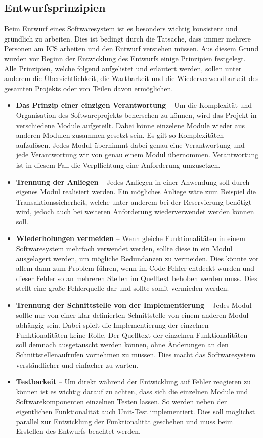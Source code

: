 		\subsection{Entwurfsprinzipien}
		Beim Entwurf eines Softwaresystem ist es besonders wichtig konsistent und gründlich zu arbeiten. Dies ist bedingt durch die Tatsache, dass immer mehrere Personen am \ac{ICS} arbeiten und den Entwurf verstehen müssen. Aus diesem Grund wurden vor Beginn der Entwicklung des Entwurfs einige Prinzipien festgelegt. Alle Prinzipien, welche folgend aufgelistet und erläutert werden, sollen unter anderem die Übersichtlichkeit, die Wartbarkeit und die Wiederverwendbarkeit des gesamten Projekts oder von Teilen davon ermöglichen.
		\begin{itemize}
			\item \textbf{Das Prinzip einer einzigen Verantwortung} -- Um die Komplexität und Organisation des Softwareprojekts beherschen zu können, wird das Projekt in verschiedene Module aufgeteilt. Dabei könne einzelene Module wieder aus anderen Modulen zusammen gesetzt sein. Es gilt so Komplexitäten aufzulösen. Jedes Modul übernimmt dabei genau eine Verantwortung und jede Verantwortung wir von genau einem Modul übernommen. Verantwortung ist in diesem Fall die Verpflichtung eine Anforderung umzusetzen. \autocite[Vgl.][]{Lahres.2015}
			\item \textbf{Trennung der Anliegen} -- Jedes Anliegen in einer Anwendung soll durch eigenes Modul realisiert werden. Ein mögliches Anliege wäre zum Beispiel die Transaktionssicherheit, welche unter anderem bei der Reservierung benötigt wird, jedoch auch bei weiteren Anforderung wiederverwendet werden können soll.\autocite[Vgl.][]{Lahres.2015} 
			\item \textbf{Wiederholungen vermeiden} -- Wenn gleiche Funktionalitäten in einem Softwaresystem mehrfach verwendet werden, sollte diese in ein Modul ausgelagert werden, um mögliche Redundanzen zu vermeiden. Dies könnte vor allem dann zum Problem führen, wenn im Code Fehler entdeckt wurden und dieser Fehler so an mehreren Stellen im Quelltext behoben werden muss. Dies stellt eine große Fehlerquelle dar und sollte somit vermieden werden.\autocite[Vgl.][]{Lahres.2015} 
			\item \textbf{Trennung der Schnittstelle von der Implementierung} -- Jedes Modul sollte nur von einer klar definierten Schnittstelle von einem anderen Modul abhängig sein. Dabei spielt die Implementierung der einzelnen Funktionalitäten keine Rolle. Der Quelltext der einzelnen Funktionalitäten soll demnach ausgetauscht werden können, ohne Änderungen an den Schnittstellenaufrufen vornehmen zu müssen. Dies macht das Softwaresystem verständlicher und einfacher zu warten.\autocite[Vgl.][]{Lahres.2015} 
			\item \textbf{Testbarkeit} -- Um direkt während der Entwicklung auf Fehler reagieren zu können ist es wichtig darauf zu achten, dass sich die einzelnen Module und Softwarekomponenten einzelnen Testen lassen. So werden neben der eigentlichen Funktionalität auch Unit-Test implementiert. Dies soll möglichst parallel zur Entwicklung der Funktionalität geschehen und muss beim Erstellen des Entwurfs beachtet werden.\autocite[Vgl.][]{Lahres.2015} 
		\end{itemize} 
